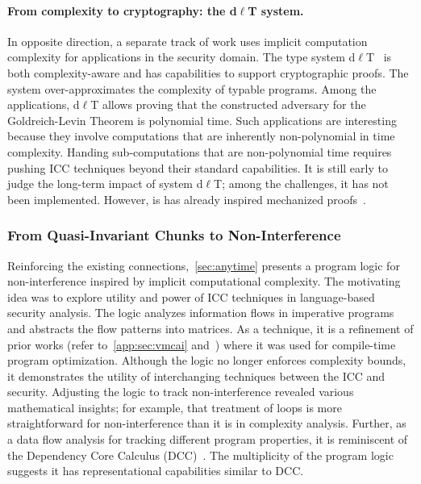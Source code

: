 \paragraph*{From complexity to cryptography: the d\(\ell\)T system.}
In opposite direction, a separate track of work uses implicit computation complexity for applications in the security domain.
The type system d\(\ell\)T~\cite{baillot2015,baillot2019} is both complexity-aware and has capabilities to support cryptographic proofs.
The system over-approximates the complexity of typable programs.
Among the applications, d\(\ell\)T allows proving that the constructed adversary for 
the Goldreich-Levin Theorem is polynomial time.
Such applications are interesting because they involve computations that are inherently non-polynomial in time complexity.
Handing sub-computations that are non-polynomial time requires pushing ICC techniques beyond their standard capabilities.
It is still early to judge the long-term impact of system d\(\ell\)T\@;
among the challenges, it has not been implemented.
However, is has already inspired mechanized proofs~\cite{barbosa2021,feree2018}.

\subsubsection{From Quasi-Invariant Chunks to Non-Interference}
\label{quasi-ni}

Reinforcing the existing connections,~\autoref{sec:anytime} presents a program logic for non-interference inspired by implicit computational complexity.
The motivating idea was to explore utility and power of ICC techniques in language-based security analysis.
The logic analyzes information flows in imperative programs and abstracts the flow patterns into matrices.
As a technique, it is a refinement of prior works (refer to~\autoref{app:sec:vmcai} and~\cite{moyen20172}) where it was used for compile-time program optimization.
Although the logic no longer enforces complexity bounds, it demonstrates the utility of interchanging techniques between the ICC and security.
Adjusting the logic to track {non-interference} revealed various mathematical insights;
for example, that treatment of loops is more straightforward for {non-interference} than it is in {complexity analysis}.
Further, as a data flow analysis for tracking different program properties, 
it is reminiscent of the {Dependency Core Calculus (DCC)}~\cite{abadi1999b}.
The multiplicity of the program logic suggests it has representational capabilities similar to DCC.
